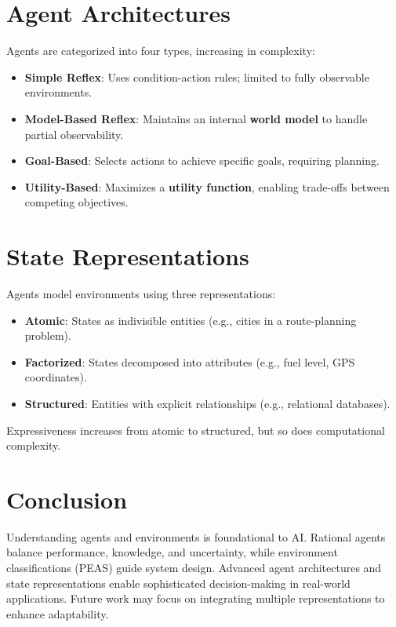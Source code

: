 \documentclass[conference]{IEEEtran}
\begin{document}
\section{Agent Architectures}
Agents are categorized into four types, increasing in complexity:
\begin{itemize}
    \item \textbf{Simple Reflex}: Uses condition-action rules; limited to fully observable environments.
    \item \textbf{Model-Based Reflex}: Maintains an internal \textbf{world model} to handle partial observability.
    \item \textbf{Goal-Based}: Selects actions to achieve specific goals, requiring planning.
    \item \textbf{Utility-Based}: Maximizes a \textbf{utility function}, enabling trade-offs between competing objectives.
\end{itemize}

\section{State Representations}
Agents model environments using three representations:
\begin{itemize}
    \item \textbf{Atomic}: States as indivisible entities (e.g., cities in a route-planning problem).
    \item \textbf{Factorized}: States decomposed into attributes (e.g., fuel level, GPS coordinates).
    \item \textbf{Structured}: Entities with explicit relationships (e.g., relational databases).
\end{itemize}
Expressiveness increases from atomic to structured, but so does computational complexity.

\section{Conclusion}
Understanding agents and environments is foundational to AI. Rational agents balance performance, knowledge, and uncertainty, while environment classifications (PEAS) guide system design. Advanced agent architectures and state representations enable sophisticated decision-making in real-world applications. Future work may focus on integrating multiple representations to enhance adaptability.
\end{document}
